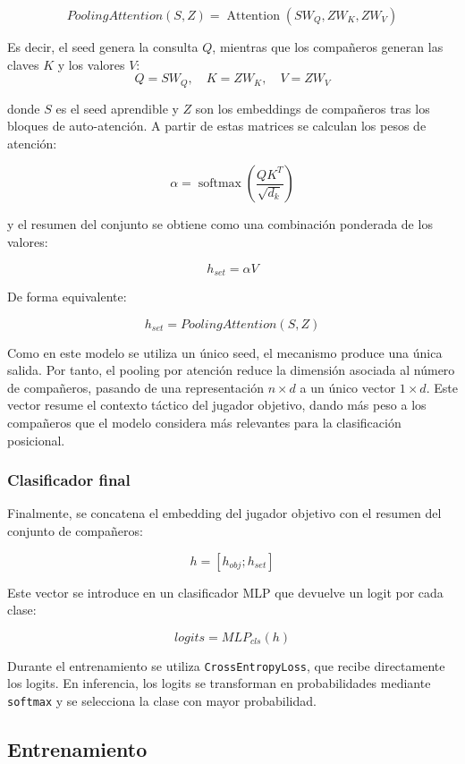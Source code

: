 \[
PoolingAttention(S,Z) =
\operatorname{Attention}(SW_Q, ZW_K, ZW_V)
\]

Es decir, el seed genera la consulta \(Q\), mientras que los compañeros generan las claves \(K\) y los valores \(V\):
\[
Q = SW_Q,\quad K = ZW_K,\quad V = ZW_V
\]

donde \(S\) es el seed aprendible y \(Z\) son los embeddings de compañeros tras los bloques de auto-atención. A partir de estas matrices se calculan los pesos de atención:

\[
\alpha =
\operatorname{softmax}\left(\frac{QK^T}{\sqrt{d_k}}\right)
\]

y el resumen del conjunto se obtiene como una combinación ponderada de los valores:

\[
h_{set} = \alpha V
\]

De forma equivalente:

\[
h_{set} = PoolingAttention(S,Z)
\]


Como en este modelo se utiliza un único seed, el mecanismo produce una única salida. Por tanto, el pooling por atención reduce la dimensión asociada al número de compañeros, pasando de una representación \(n \times d\) a un único vector \(1 \times d\). Este vector resume el contexto táctico del jugador objetivo, dando más peso a los compañeros que el modelo considera más relevantes para la clasificación posicional.

\subsubsection{Clasificador final}

Finalmente, se concatena el embedding del jugador objetivo con el resumen del conjunto de compañeros:

\[
h = [h_{obj}; h_{set}]
\]

Este vector se introduce en un clasificador MLP que devuelve un logit por cada clase:

\[
logits = MLP_{cls}(h)
\]

Durante el entrenamiento se utiliza \texttt{CrossEntropyLoss}, que recibe directamente los logits. En inferencia, los logits se transforman en probabilidades mediante \texttt{softmax} y se selecciona la clase con mayor probabilidad.

\subsection{Entrenamiento}
\label{subsec:entrenamiento-modelo-posicional}

